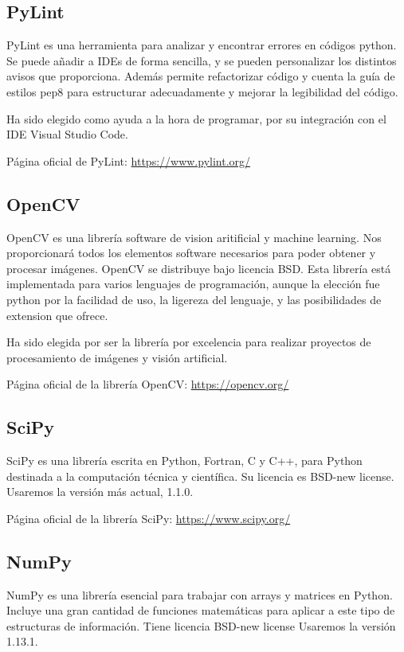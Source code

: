 \subsection{PyLint}
PyLint es una herramienta para analizar y encontrar errores en códigos python. Se puede añadir a IDEs de forma sencilla, y se pueden personalizar los distintos avisos que proporciona. 
Además permite refactorizar código y cuenta la guía de estilos pep8\cite{pep8} para estructurar adecuadamente y mejorar la legibilidad del código.

Ha sido elegido como ayuda a la hora de programar, por su integración con el IDE Visual Studio Code.

Página oficial de PyLint: \url{https://www.pylint.org/}

\subsection{OpenCV}
OpenCV es una librería software de vision aritificial y machine learning. Nos proporcionará todos los elementos software necesarios para poder obtener y procesar imágenes. 
OpenCV se distribuye bajo licencia BSD. 
Esta librería está implementada para varios lenguajes de programación, aunque la elección fue python por la facilidad de uso, la ligereza del lenguaje, y las posibilidades de extension que ofrece.

Ha sido elegida por ser la librería por excelencia para realizar proyectos de procesamiento de imágenes y visión artificial.

Página oficial de la librería OpenCV: \url{https://opencv.org/}

\subsection{SciPy}
SciPy es una librería escrita en Python, Fortran, C y C++, para Python destinada a la computación técnica y científica. 
Su licencia es BSD-new license.
Usaremos la versión más actual, 1.1.0.

Página oficial de la librería SciPy: \url{https://www.scipy.org/}

\subsection{NumPy}
NumPy es una librería esencial para trabajar con arrays y matrices en Python. Incluye una gran cantidad de funciones matemáticas para aplicar a este tipo de estructuras de información.
Tiene licencia BSD-new license
Usaremos la versión 1.13.1.


